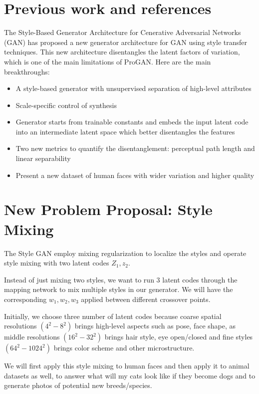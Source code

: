 \documentclass{article}
\begin{document}
\section{Previous work and references}

The Style-Based Generator Architecture for Cenerative Adversarial Networks (GAN)\cite{stylegan} has proposed a new generator architecture for GAN using style transfer techniques\cite{styletransferog}. This new architecture disentangles the latent factors of variation, which is one of the main limitations of ProGAN\cite{progan}. Here are the main breakthroughs:

\begin{itemize}
\item A style-based generator with unsupervised separation of high-level attributes 
\item Scale-specific control of synthesis
\item Generator starts from trainable constants and embeds the input latent code into an intermediate latent space which better disentangles the features
\item Two new metrics to quantify the disentanglement: perceptual path length and linear separability
\item Present a new dataset of human faces with wider variation and higher quality
\end{itemize}

\section{New Problem Proposal: Style Mixing}

The Style GAN\cite{stylegan} employ mixing regularization to localize the styles and operate style mixing with two latent codes $Z_1, z_2$. 

Instead of just mixing two styles, we want to run 3 latent codes through the mapping network to mix multiple styles in our generator. We will have the corresponding $w_1, w_2 , w_3$ applied between different crossover points. 

Initially, we choose three number of latent codes because coarse spatial resolutions $(4^2-8^2)$ brings high-level aspects such as pose, face shape, as middle resolutions $(16^2-32^2)$ brings hair style, eye open/closed and fine styles $(64^2-1024^2)$ brings color scheme and other microstructure.

We will first apply this style mixing to human faces and then apply it to animal datasets as well, to answer what will my cats look like if they become dogs and to generate photos of potential new breeds/species.
\end{document}
